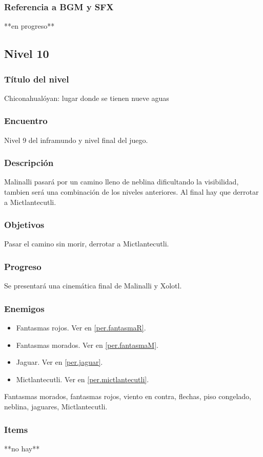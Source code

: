 \documentclass[11pt,letterpaper]{article}
\begin{document}
	\subsubsection{Referencia a BGM y SFX}
	**en progreso**
	
	
		\subsection{Nivel 10}
	\subsubsection{Título del nivel}
	Chiconahualóyan: lugar donde se tienen nueve aguas
	\subsubsection{Encuentro}
	Nivel 9 del inframundo y nivel final del juego.
	\subsubsection{Descripción}
	Malinalli pasará por un camino lleno de neblina dificultando la visibilidad, tambien será una combinación de los niveles anteriores. Al final hay que derrotar a Mictlantecutli.
	\subsubsection{Objetivos}
	Pasar el camino sin morir, derrotar a Mictlantecutli.
	\subsubsection{Progreso}
	Se presentará una cinemática final de Malinalli y Xolotl.
	\subsubsection{Enemigos}
	\begin{itemize}
		\item Fantasmas rojos. Ver en \ref{per.fantasmaR}.
		\item Fantasmas morados. Ver en \ref{per.fantasmaM}.
		\item Jaguar. Ver en \ref{per.jaguar}.
		\item Mictlantecutli. Ver en \ref{per.mictlantecutli}.
	\end{itemize}
	Fantasmas morados, fantasmas rojos, viento en contra, flechas, piso congelado, neblina, jaguares, Mictlantecutli.
	\subsubsection{Items}
	**no hay**
\end{document}
